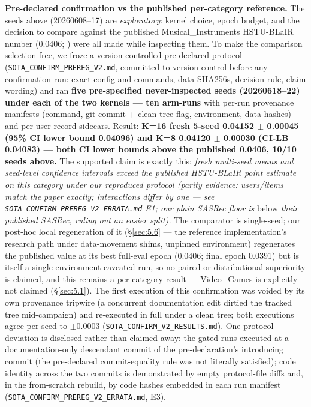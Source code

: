 \textbf{Pre-declared confirmation vs the published per-category reference.} The seeds above (20260608--17) are \emph{exploratory}: kernel choice, epoch budget, and the decision to compare against the published Musical\_Instruments HSTU-BLaIR number (0.0406; \citealp[Table 2]{liu2025hstublair}) were all made while inspecting them. To make the comparison selection-free, we froze a version-controlled pre-declared protocol (\texttt{SOTA\_CONFIRM\_PREREG\_V2.md}, committed to version control before any confirmation run: exact config and commands, data SHA256s, decision rule, claim wording) and ran \textbf{five pre-specified never-inspected seeds (20260618--22) under each of the two kernels --- ten arm-runs} with per-run provenance manifests (command, git commit + clean-tree flag, environment, data hashes) and per-user record sidecars. Result: \textbf{K=16 fresh 5-seed 0.04152 \ensuremath{\pm} 0.00045 (95\% CI lower bound 0.04096) and K=8 0.04120 \ensuremath{\pm} 0.00030 (CI-LB 0.04083) --- both CI lower bounds above the published 0.0406, 10/10 seeds above.} The supported claim is exactly this: \emph{fresh multi-seed means and seed-level confidence intervals exceed the published HSTU-BLaIR point estimate on this category under our reproduced protocol (parity evidence: users/items match the paper exactly; interactions differ by one --- see \texttt{SOTA\_CONFIRM\_PREREG\_V2\_ERRATA.md} E1; our plain SASRec floor is} below \emph{their published SASRec, ruling out an easier split).} The comparator is single-seed; our post-hoc local regeneration of it (\S\ref{sec:5.6} --- the reference implementation's research path under data-movement shims, unpinned environment) regenerates the published value at its best full-eval epoch (0.0406; final epoch 0.0391) but is itself a single environment-caveated run, so no paired or distributional superiority is claimed, and this remains a per-category result --- Video\_Games is explicitly not claimed (\S\ref{sec:5.1}). The first execution of this confirmation was voided by its own provenance tripwire (a concurrent documentation edit dirtied the tracked tree mid-campaign) and re-executed in full under a clean tree; both executions agree per-seed to \ensuremath{\pm}0.0003 (\texttt{SOTA\_CONFIRM\_V2\_RESULTS.md}). One protocol deviation is disclosed rather than claimed away: the gated runs executed at a documentation-only descendant commit of the pre-declaration's introducing commit (the pre-declared commit-equality rule was not literally satisfied); code identity across the two commits is demonstrated by empty protocol-file diffs and, in the from-scratch rebuild, by code hashes embedded in each run manifest (\texttt{SOTA\_CONFIRM\_PREREG\_V2\_ERRATA.md}, E3).

